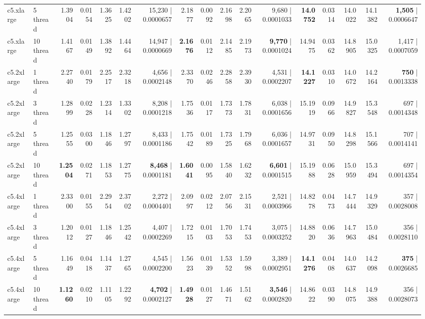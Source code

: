 \documentclass[conference]{IEEEtran}
\begin{document}
\begin{table}[h]
{\begin{tabular}{ll|rrrrr|rrrrr|rrrrr}
			c5.xlarge & 5 thread & 1.3904 & 0.0154 & 1.3625 & 1.4202 & 15,230 | 0.0000657 & 2.1877 & 0.0092 & 2.1698 & 2.2065 & 9,680 | 0.0001033 & \textbf{14.0752} & 0.0314 & 14.0022 & 14.1382 & \textbf{1,505} | 0.0006647 \\
			c5.xlarge & 10 thread & 1.4167 & 0.0149 & 1.3892 & 1.4464 & 14,947 | 0.0000669 & \textbf{2.1676} & 0.0112 & 2.1485 & 2.1973 & \textbf{9,770} | 0.0001024 & 14.9475 & 0.0362 & 14.8905 & 15.0325 & 1,417 | 0.0007059 \\
			\midrule
			c5.2xlarge & 1 thread & 2.2740 & 0.0179 & 2.2517 & 2.3218 & 4,656 | 0.0002148 & 2.3370 & 0.0246 & 2.2858 & 2.3930 & 4,531 | 0.0002207 & \textbf{14.1227} & 0.0310 & 14.0672 & 14.2164 & \textbf{750} | 0.0013338 \\
			c5.2xlarge & 3 thread & 1.2899 & 0.0228 & 1.2314 & 1.3302 & 8,208 | 0.0001218 & 1.7536 & 0.0117 & 1.7373 & 1.7831 & 6,038 | 0.0001656 & 15.1919 & 0.0966 & 14.9827 & 15.3548 & 697 | 0.0014348 \\
			c5.2xlarge & 5 thread & 1.2555 & 0.0300 & 1.1846 & 1.2797 & 8,433 | 0.0001186 & 1.7542 & 0.0189 & 1.7325 & 1.7968 & 6,036 | 0.0001657 & 14.9731 & 0.0950 & 14.8298 & 15.1566 & 707 | 0.0014141 \\
			c5.2xlarge & 10 thread & \textbf{1.2504} & 0.0271 & 1.1853 & 1.2775 & \textbf{8,468} | 0.0001181 & \textbf{1.6041} & 0.0095 & 1.5840 & 1.6232 & \textbf{6,601} | 0.0001515 & 15.1988 & 0.0628 & 15.0959 & 15.3494 & 697 | 0.0014354 \\
			\midrule
			c5.4xlarge & 1 thread & 2.3300 & 0.0155 & 2.2954 & 2.3702 & 2,272 | 0.0004401 & 2.0997 & 0.0212 & 2.0756 & 2.1531 & 2,521 | 0.0003966 & 14.8278 & 0.0473 & 14.7444 & 14.9329 & 357 | 0.0028008 \\
			c5.4xlarge & 3 thread & 1.2012 & 0.0127 & 1.1846 & 1.2542 & 4,407 | 0.0002269 & 1.7215 & 0.0103 & 1.7053 & 1.7453 & 3,075 | 0.0003252 & 14.8820 & 0.0636 & 14.7963 & 15.0484 & 356 | 0.0028110 \\
			c5.4xlarge & 5 thread & 1.1649 & 0.0418 & 1.1437 & 1.2765 & 4,545 | 0.0002200 & 1.5623 & 0.0139 & 1.5352 & 1.5998 & 3,389 | 0.0002951 & \textbf{14.1276} & 0.0408 & 14.0637 & 14.2098 & \textbf{375} | 0.0026685 \\
			c5.4xlarge & 10 thread & \textbf{1.1260} & 0.0210 & 1.1105 & 1.2292 & \textbf{4,702} | 0.0002127 & \textbf{1.4928} & 0.0127 & 1.4671 & 1.5162 & \textbf{3,546} | 0.0002820 & 14.8622 & 0.0390 & 14.8075 & 14.9388 & 356 | 0.0028073 \\
				\bottomrule
			\end{tabular}
		}
	\end{table}
\end{document}
